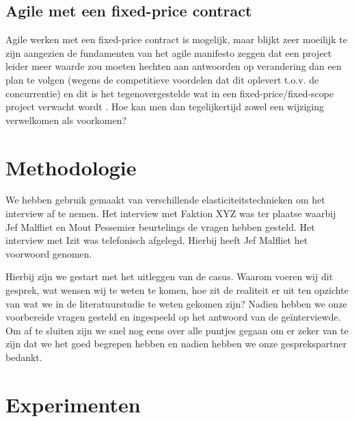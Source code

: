 \documentclass{hogent-article}
\begin{document}
    \subsection{Agile met een fixed-price contract}
    Agile werken met een fixed-price contract is mogelijk, maar blijkt zeer moeilijk te zijn aangezien de fundamenten van het agile manifesto zeggen dat een project leider meer waarde zou moeten hechten aan antwoorden op verandering dan een plan te volgen (wegens de competitieve voordelen dat dit oplevert t.o.v. de concurrentie) en dit is het tegenovergestelde wat in een fixed-price/fixed-scope project verwacht wordt \autocite{PMI2011}. Hoe kan men dan tegelijkertijd zowel een wijziging verwelkomen als voorkomen?
	
	\section{Methodologie}
	We hebben gebruik gemaakt van verschillende elasticiteitstechnieken om het interview af te nemen. Het interview met Faktion XYZ was ter plaatse waarbij Jef Malfliet en Mout Pessemier beurtelings de vragen hebben gesteld. Het interview met Izit was telefonisch afgelegd. Hierbij heeft Jef Malfliet het voorwoord genomen.
	
	Hierbij zijn we gestart met het uitleggen van de casus. Waarom voeren wij dit gesprek, wat wensen wij te weten te komen, hoe zit de realiteit er uit ten opzichte van wat we in de literatuurstudie te weten gekomen zijn? Nadien hebben we onze voorbereide vragen gesteld en ingespeeld op het antwoord van de geïnterviewde. Om af te sluiten zijn we snel nog eens over alle puntjes gegaan om er zeker van te zijn dat we het goed begrepen hebben en nadien hebben we onze gesprekspartner bedankt.
	
	\section{Experimenten}
\end{document}
